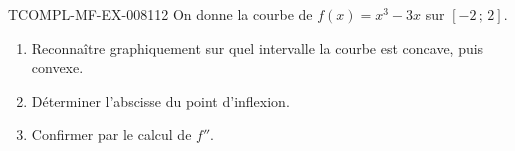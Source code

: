 \begin{exercice}{TCOMPL-MF-EX-008}{1}{12}
On donne la courbe de $f(x)=x^3-3x$ sur $[-2\,;\,2]$.
\begin{enumerate}
  \item Reconnaître graphiquement sur quel intervalle la courbe est concave,
        puis convexe.
  \item Déterminer l'abscisse du point d'inflexion.
  \item Confirmer par le calcul de $f''$.
\end{enumerate}
\end{exercice}
